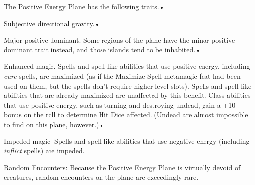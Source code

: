 \documentclass{article}
\begin{document}
The Positive Energy Plane has the following traits.• 

\parindent=3pt
Subjective directional gravity.• 

Major positive-dominant. Some regions of the plane have the minor positive-dominant 
trait instead, and those islands tend to be inhabited.• 

\parindent=7pt
Enhanced magic. Spells and spell-like abilities that use positive energy, including 
\textit{cure }spells, are maximized (as if the Maximize Spell metamagic feat had 
been used on them, but the spells don't require higher-level slots). Spells and 
spell-like abilities that are already maximized are unaffected by this benefit. 
Class abilities that use positive energy, such as turning and destroying undead, 
gain a +10 bonus on the roll to determine Hit Dice affected. (Undead are almost 
impossible to find on this plane, however.)• 

\parindent=3pt
Impeded magic. Spells and spell-like abilities that use negative energy (including 
\textit{inflict }spells) are impeded.

\parindent=0pt
Random Encounters: Because the Positive Energy Plane is virtually devoid of creatures, 
random encounters on the plane are exceedingly rare.

\newpage
\end{document}

